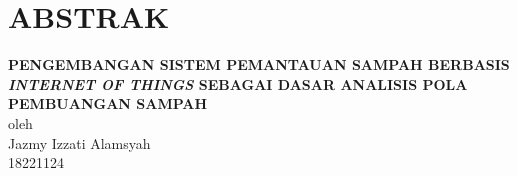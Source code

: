 \chapter*{ABSTRAK}

\begin{center}

    \textbf{\MakeUppercase{Pengembangan Sistem Pemantauan Sampah Berbasis \protect\textit{Internet of Things} sebagai Dasar Analisis Pola Pembuangan Sampah}} \\
    \vspace{0.4cm}
    oleh \\
    \vspace{0.4cm}
    Jazmy Izzati Alamsyah\\
    18221124\\
\end{center}


